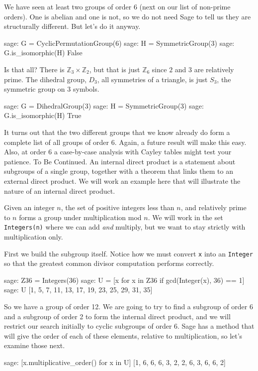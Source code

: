 %
We have seen at least two groups of order $6$ (next on our list of non-prime orders).  One is abelian and one is not, so we do not need Sage to tell us they are structurally different.  But let's do it anyway.
%
\begin{sageexample}
sage: G = CyclicPermutationGroup(6)
sage: H = SymmetricGroup(3)
sage: G.is_isomorphic(H)
False
\end{sageexample}
%
Is that all?  There is ${\mathbb Z}_3\times{\mathbb Z}_2$, but that is just ${\mathbb Z}_6$ since $2$ and $3$ are relatively prime.  The dihedral group, $D_3$, all symmetries of a triangle, is just $S_3$, the symmetric group on $3$ symbols.
%
\begin{sageexample}
sage: G = DihedralGroup(3)
sage: H = SymmetricGroup(3)
sage: G.is_isomorphic(H)
True
\end{sageexample}
%
It turns out that the two different groups that we know already do form a complete list of all groups of order $6$.  Again, a future result will make this easy.  Also, at order $6$ a case-by-case analysis with Cayley tables might test your patience.  To Be Continued.
%
%
An internal direct product is a statement about subgroups of a single group, together with a theorem that links them to an external direct product.  We will work an example here that will illustrate the nature of an internal direct product.\par
%
Given an integer $n$, the set of positive integers less than $n$, and relatively prime to $n$ forms a group under multiplication mod $n$.  We will work in the set \verb?Integers(n)? where we can add \emph{and} multiply, but we want to stay strictly with multiplication only.\par
%
First we build the subgroup itself.  Notice how we must convert \verb?x? into an \verb?Integer? so that the greatest common divisor computation performs correctly.
%
\begin{sageexample}
sage: Z36 = Integers(36)
sage: U = [x for x in Z36 if gcd(Integer(x), 36) == 1]
sage: U
[1, 5, 7, 11, 13, 17, 19, 23, 25, 29, 31, 35]
\end{sageexample}
%
So we have a group of order 12.  We are going to try to find a subgroup of order 6 and a subgroup of order 2 to form the internal direct product, and we will restrict our search initially to cyclic subgroups of order 6.  Sage has a method that will give the order of each of these elements, relative to multiplication, so let's examine those next.
%
\begin{sageexample}
sage: [x.multiplicative_order() for x in U]
[1, 6, 6, 6, 3, 2, 2, 6, 3, 6, 6, 2]
\end{sageexample}

